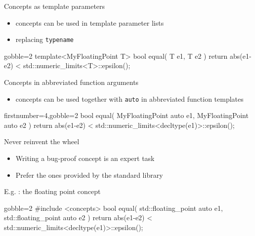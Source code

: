 \begin{frame}[fragile]
    \begin{block}{Concepts as template parameters}
      \begin{itemize}
      \item concepts can be used in template parameter lists
      \item replacing \texttt{typename}
      \end{itemize}
    \end{block}
    \begin{exampleblock}{}
      \small
      \begin{cppcode*}{gobble=2}
      template<MyFloatingPoint T>
      bool equal( T e1, T e2 ) {
        return abs(e1-e2) < std::numeric_limits<T>::epsilon();
      }
      \end{cppcode*}
    \end{exampleblock}
    \begin{block}{Concepts in abbreviated function arguments}
      \begin{itemize}
        \item concepts can be used together with \texttt{auto} in abbreviated function templates
      \end{itemize}
    \end{block}
    \begin{exampleblock}{}
      \small
      \begin{cppcode*}{firstnumber=4,gobble=2}
      bool equal( MyFloatingPoint auto e1,
                  MyFloatingPoint auto e2 ) {
        return abs(e1-e2) <
               std::numeric_limits<decltype(e1)>::epsilon(); }
      \end{cppcode*}
    \end{exampleblock}
\end{frame}

\begin{frame}[fragile]
    \begin{block}{Never reinvent the wheel}
      \begin{itemize}
        \item Writing a bug-proof concept is an expert task
        \item Prefer the ones provided by the standard library
      \end{itemize}
    \end{block}
    \begin{exampleblock}{E.g. : the floating point concept}
      \small
      \begin{cppcode*}{gobble=2}
      #include <concepts>
      bool equal( std::floating_point auto e1,
                  std::floating_point auto e2 ) {
        return abs(e1-e2) <
               std::numeric_limits<decltype(e1)>::epsilon();
      }
      \end{cppcode*}
    \end{exampleblock}
\end{frame}

